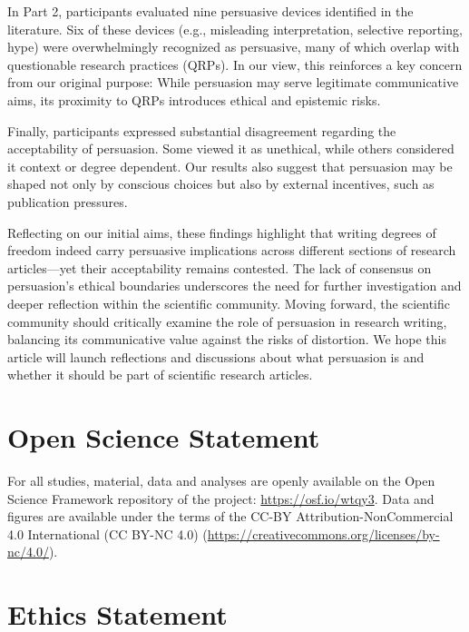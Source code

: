 \documentclass[authordate, meta]{jote-new-article}
\begin{document}
	In Part 2, participants evaluated nine persuasive devices identified in the literature. Six of these devices (e.g., misleading interpretation, selective reporting, hype) were overwhelmingly recognized as persuasive, many of which overlap with questionable research practices (QRPs). In our view, this reinforces a key concern from our original purpose: While persuasion may serve legitimate communicative aims, its proximity to QRPs introduces ethical and epistemic risks.



	Finally, participants expressed substantial disagreement regarding the acceptability of persuasion. Some viewed it as unethical, while others considered it context or degree dependent. Our results also suggest that persuasion may be shaped not only by conscious choices but also by external incentives, such as publication pressures.



	Reflecting on our initial aims, these findings highlight that writing degrees of freedom indeed carry persuasive implications across different sections of research articles—yet their acceptability remains contested. The lack of consensus on persuasion's ethical boundaries underscores the need for further investigation and deeper reflection within the scientific community. Moving forward, the scientific community should critically examine the role of persuasion in research writing, balancing its communicative value against the risks of distortion. We hope this article will launch reflections and discussions about what persuasion is and whether it should be part of scientific research articles.




	\section{\textbf{Open Science Statement}}



	For all studies, material, data and analyses are openly available on the Open Science Framework repository of the project: \url{https://osf.io/wtqy3}. Data and figures are available under the terms of the CC-BY Attribution-NonCommercial 4.0 International (CC BY-NC 4.0) (\url{https://creativecommons.org/licenses/by-nc/4.0/}).



	\section{\textbf{Ethics Statement}}
\end{document}
